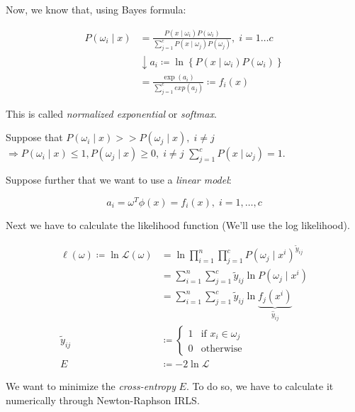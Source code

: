 
Now, we know that, using Bayes formula:

\begin{align*}
  P(\omega_i \mid x) &= \frac{P(x \mid \omega_i)P(\omega_i)}{\sum_{j=1}^c P(x \mid \omega_j)P(\omega_j)}, \; i=1 \dots c \\
                & \downarrow  a_i \coloneqq \ln \left\{ P(x \mid \omega_i)P(\omega_i) \right\} \\
                &= \frac{\exp(a_i)}{\sum_{j=1}^c exp(a_j)} \coloneqq f_i(x)
\end{align*}

This is called \emph{normalized exponential} or \emph{softmax}.

Suppose that $P(\omega_i \mid x) >> P(\omega_j  \mid x), \; i \neq j$
$\Rightarrow P(\omega_i \mid x) \leq 1, P(\omega_j \mid x) \geq 0, \; i \neq j$
$\sum_{j=1}^c P(x \mid \omega_j) = 1$.

Suppose further that we want to use a \emph{linear model}:

\begin{equation*}
  a_i = \omega^T \phi(x) = f_i(x), \; i = 1, \dots, c
\end{equation*}

%

Next we have to calculate the likelihood function (We'll use the log likelihood).

\begin{align*}
  \ell(\omega) \coloneqq \ln\mathcal{L}(\omega) &= \ln
  \prod_{i=1}^n \prod_{j=1}^c P\left(\omega_j \mid x^i\right)^{\tilde{y}_{ij}} \\
  &= \sum_{i=1}^n \sum_{j=1}^c \tilde{y}_{ij} \ln P(\omega_j \mid x^i) \\
  &= \sum_{i=1}^n \sum_{j=1}^c \tilde{y}_{ij} \ln \underbrace{f_j(x^i)}_{\hat{y}_{ij}} \\[1em]
  \tilde{y}_{ij} &\coloneqq \begin{cases}
    1 & \text{if } x_i \in \omega_j \\
    0 & \text{otherwise}
  \end{cases} \\
    E &\coloneqq -2\ln \mathcal{L} \tag{Error function / cross-entropy}
\end{align*}

We want to minimize the \emph{cross-entropy} $E$. To do so, we have to
calculate it numerically through Newton-Raphson \textrightarrow{} IRLS.

